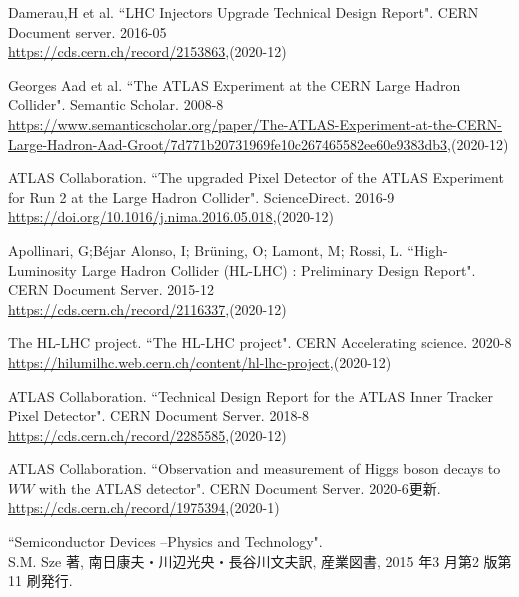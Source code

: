 \begin{thebibliography}{9}

Damerau,H et al. ``LHC Injectors Upgrade Technical Design Report". CERN Document server. 2016-05\\
\url{https://cds.cern.ch/record/2153863},(2020-12)

Georges Aad et al. ``The ATLAS Experiment at the CERN Large Hadron Collider". Semantic Scholar. 2008-8\\
\url{https://www.semanticscholar.org/paper/The-ATLAS-Experiment-at-the-CERN-Large-Hadron-Aad-Groot/7d771b20731969fe10c267465582ee60e9383db3},(2020-12)

ATLAS Collaboration. ``The upgraded Pixel Detector of the ATLAS Experiment for Run 2 at the Large Hadron Collider". ScienceDirect. 2016-9\\
\url{https://doi.org/10.1016/j.nima.2016.05.018},(2020-12)

Apollinari, G;Béjar Alonso, I; Brüning, O; Lamont, M; Rossi, L. ``High-Luminosity Large Hadron Collider (HL-LHC) : Preliminary Design Report". CERN Document Server. 2015-12\\
\url{https://cds.cern.ch/record/2116337},(2020-12)

The HL-LHC project. ``The HL-LHC project". CERN Accelerating science. 2020-8\\
\url{https://hilumilhc.web.cern.ch/content/hl-lhc-project},(2020-12)

ATLAS Collaboration. ``Technical Design Report for the ATLAS Inner Tracker Pixel Detector". CERN Document Server. 2018-8\\
\url{https://cds.cern.ch/record/2285585},(2020-12)


ATLAS Collaboration. ``Observation and measurement of Higgs boson decays to $WW$ with the ATLAS detector". CERN Document Server. 2020-6更新.\\
\url{https://cds.cern.ch/record/1975394},(2020-1)

``Semiconductor Devices –Physics and Technology".\\
S.M. Sze 著, 南日康夫・川辺光央・長谷川文夫訳, 産業図書, 2015 年3 月第2 版第11 刷発行.


\end{thebibliography}

